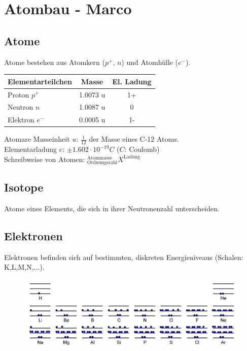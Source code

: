 \section{Atombau - Marco}

\subsection{Atome}
Atome bestehen aus Atomkern ($p^+$, $n$) und Atomhülle ($e^-$).

\begin{table}[htbp]
	\begin{tabular}{|l|c|c|}
		Elementarteilchen & Masse & El. Ladung \\ \hline
		Proton $p^+$ & 1.0073 u & 1+ \\
		Neutron $n$ & 1.0087 u & 0 \\
		Elektron $e^-$ & 0.0005 u & 1- \\ \hline
	\end{tabular}
\end{table}

Atomare Masseinheit $u$: $\frac{1}{12}$ der Masse eines C-12 Atoms. \\

Elementarladung $e$: $\pm 1.602 \cdot 10^{-19} C$ ($C$: Coulomb) \\

Schreibweise von Atomen: $ ^\text{Atommasse}_\text{Ordnungszahl} X ^\text{Ladung}$ \\

\subsection{Isotope}
Atome eines Elements, die sich in ihrer Neutronenzahl unterscheiden.

\subsection{Elektronen}
Elektronen befinden sich auf bestimmten, diskreten Energieniveaus (Schalen: K,L,M,N,...). 

\begin{figure}[htbp]
	\centering
	\includegraphics[width=0.9\linewidth]{images/2_Energie_der_Elektronen.png}
\end{figure}


